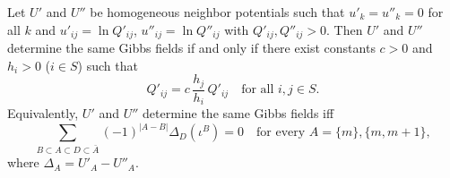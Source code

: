 Let $U'$ and $U''$ be homogeneous neighbor potentials such that $u'_k = u''_k = 0$ for all $k$ and
$u'_{ij} = \ln Q'_{ij}$, $u''_{ij} = \ln Q''_{ij}$ with $Q'_{ij}, Q''_{ij} > 0$. Then $U'$ and $U''$ determine the same Gibbs fields if and only if there exist constants $c > 0$ and $h_i > 0$ ($i \in S$) such that
$$
Q'_{ij} = c \, \frac{h_j}{h_i} \, Q'_{ij} \quad \text{for all } i, j \in S.
$$
Equivalently, $U'$ and $U''$ determine the same Gibbs fields iff
$$
\sum_{B \subset A \subset D \subset \bar{A}} (-1)^{|A-B|} \Delta_D(\iota^B) = 0 \quad \text{for every } A = \{m\}, \{m, m+1\},
$$
where $\Delta_A = U'_A - U''_A$.
